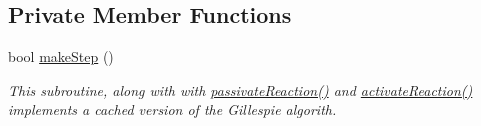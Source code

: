 \subsection*{Private Member Functions}
\begin{DoxyCompactItemize}
\item 
bool \hyperlink{classChemGillespieImpl_a4474dce6c1c9074569cbdf75a991f82a}{make\+Step} ()
\begin{DoxyCompactList}\small\item\em This subroutine, along with with \hyperlink{classChemGillespieImpl_a5916a11b71b642edee290af9fc969b28}{passivate\+Reaction()} and \hyperlink{classChemGillespieImpl_aefbeeeb2edf0d6726cf50c129e320e58}{activate\+Reaction()} implements a cached version of the Gillespie algorith. \end{DoxyCompactList}\end{DoxyCompactItemize}
